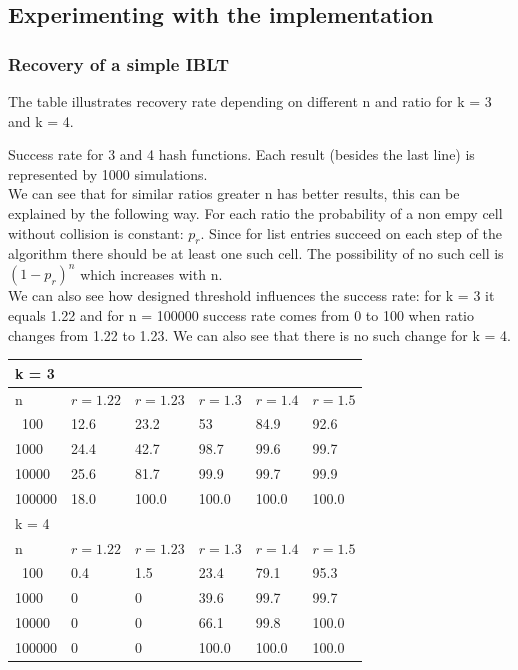 \documentclass{article}
\begin{document}
\subsection{Experimenting with the implementation}

\subsubsection{Recovery of a simple IBLT}
The table illustrates recovery rate depending on different n and ratio for k = 3 and k = 4.

Success rate for 3 and 4 hash functions. Each result (besides the last line) is 
represented by 1000 simulations. \\ 
We can see that for similar ratios greater n has better results, this can be 
explained by the following way. For each ratio the probability of a non empy 
cell without collision is constant: $p_r$. Since for list entries succeed on each
step of the algorithm there should be at least one such cell. The possibility of
no such cell is $(1 - p_r)^n$ which increases with n. \\

We can also see how designed threshold influences the success rate: for k = 3 it
equals 1.22 and for n = 100000 success rate comes from 0 to 100 when ratio 
changes from 1.22 to 1.23. We can also see that there is no such change for k = 4.
\begin{center}
\begin{tabular}{l | l | l | l | l | l} \hline \hline k = 3 \\ \hline
    \hline n & $r = 1.22$ &  $r = 1.23$  &  $r = 1.3$ & $r = 1.4$ & $r = 1.5$\\ \hline
    \hline \ 100 & 12.6 & 23.2 & 53 & 84.9 & 92.6 \\ \hline 
    1000 & 24.4 & 42.7 & 98.7 & 99.6 & 99.7 \\ \hline
    10000 & 25.6 & 81.7 & 99.9 & 99.7 & 99.9 \\ \hline
    100000 & 18.0 & 100.0 & 100.0 & 100.0 & 100.0 \\ \hline
    \hline
    k = 4 \\
    \hline
    \hline n & $r = 1.22$ &  $r = 1.23$  &  $r = 1.3$ & $r = 1.4$ & $r = 1.5$\\ \hline
    \hline \ 100 & 0.4 & 1.5 & 23.4 & 79.1 & 95.3 \\ \hline 
    1000 & 0 & 0 & 39.6 & 99.7 & 99.7 \\ \hline
    10000 & 0 & 0 & 66.1 & 99.8 & 100.0 \\ \hline
    100000 & 0 & 0 & 100.0 & 100.0 & 100.0 \\ \hline
\end{tabular}
\end{center}
\end{document}
